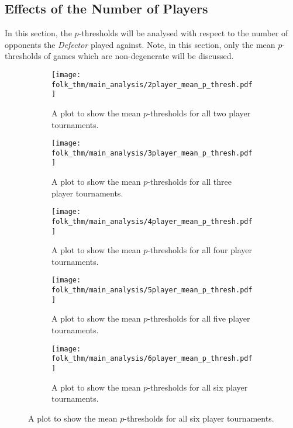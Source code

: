 \subsection{Effects of the Number of Players}\label{subsec:Effects_of_the_number_of_Players}
In this section, the \(p\)-thresholds will be analysed with respect to the
number of opponents the \textit{Defector} played against. Note, in this section,
only the mean \(p\)-thresholds of games which are non-degenerate will be discussed. 

\begin{figure}
    \begin{subfigure}{.45\textwidth}
        \centering
        \texttt{[image: folk\_thm/main\_analysis/2player\_mean\_p\_thresh.pdf]}
        \caption{A plot to show the mean \(p\)-thresholds for all two player tournaments.}\label{subfig:2player_mean_p_thresh}
    \end{subfigure}
    \begin{subfigure}{.45\textwidth}
        \centering
        \texttt{[image: folk\_thm/main\_analysis/3player\_mean\_p\_thresh.pdf]}
        \caption{A plot to show the mean \(p\)-thresholds for all three player tournaments.}\label{subfig:3player_mean_p_thresh}
    \end{subfigure}
    

    \newline


    \begin{subfigure}{.3\textwidth}
        \centering
        \texttt{[image: folk\_thm/main\_analysis/4player\_mean\_p\_thresh.pdf]}
        \caption{A plot to show the mean \(p\)-thresholds for all four player tournaments.}\label{subfig:4player_mean_p_thresh}
    \end{subfigure}
    \begin{subfigure}{.3\textwidth}
        \centering
        \texttt{[image: folk\_thm/main\_analysis/5player\_mean\_p\_thresh.pdf]}
        \caption{A plot to show the mean \(p\)-thresholds for all five player tournaments.}\label{subfig:5player_mean_p_thresh}
    \end{subfigure}
    \begin{subfigure}{.3\textwidth}
        \centering
        \texttt{[image: folk\_thm/main\_analysis/6player\_mean\_p\_thresh.pdf]}
        \caption{A plot to show the mean \(p\)-thresholds for all six player tournaments.}\label{subfig:6player_mean_p_thresh}
    \end{subfigure}



\end{figure}
